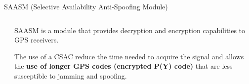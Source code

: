 \begin{frame}{SAASM (Selective Availability Anti-Spoofing Module)}
\begin{columns}[c, onlytextwidth]
\begin{column}{0.35\textwidth}
        \end{column}

        \hfill

        \begin{column}{0.6\textwidth}

            SAASM is a module that provides decryption and encryption capabilities to GPS receivers.

            \vspace{10pt}

            The use of a CSAC reduce the time needed to acquire the signal and allows the \textbf{use of longer GPS codes (encrypted P(Y) code)} that are less susceptible to jamming and spoofing.

        \end{column}

    \end{columns}

\end{frame}